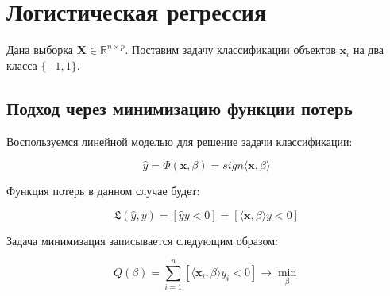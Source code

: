 \documentclass[11pt, oneside]{article}   	%
\begin{document}
%		
%		
%		
%	
%
%			
%

\section{Логистическая регрессия}

Дана выборка $\bm{X} \in \mathbb{R}^{n\times p}$. Поставим задачу классификации объектов $\bm{x}_i$ на два класса $\{-1, 1\}$. 

\subsection{Подход через минимизацию функции потерь}

Воспользуемся линейной моделью для решение задачи классификации:

\begin{equation}
	\hat{y} = \Phi(\bm{x}, \beta) = sign \langle \bm{x}, \beta \rangle
	\label{7}
\end{equation}

Функция потерь в данном случае будет:

\begin{equation}
	\mathfrak{L}(\hat{y}, y) = [\hat{y} y < 0] = [ \langle \bm{x}, \beta \rangle y < 0 ]
	\label{8}
\end{equation}

Задача минимизация записывается следующим образом:

\begin{equation}
	Q(\beta) = \sum\limits_{i = 1}^{n} [\langle \bm{x}_i, \beta \rangle y_i < 0] \rightarrow \min\limits_{\beta}
	\label{9}
\end{equation}
\end{document}
